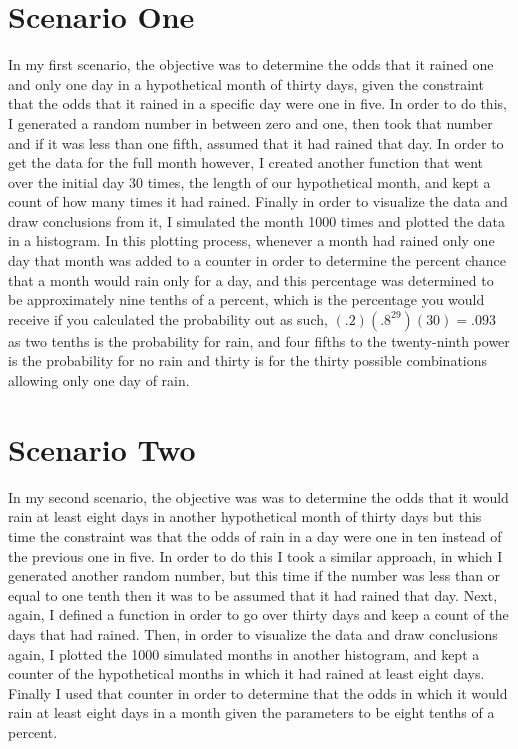 \documentclass[twocolumn]{revtex4}
\begin{document}
\section{Scenario One}
In my first scenario, the objective was to determine the odds that it rained one and only one day in a hypothetical month of thirty days, given the constraint that the odds that it rained in a specific day were one in five. In order to do this, I generated a random number in between zero and one, then took that number and if it was less than one fifth, assumed that it had rained that day. In order to get the data for the full month however, I created another function that went over the initial day 30 times, the length of our hypothetical month, and kept a count of how many times it had rained. Finally in order to visualize the data and draw conclusions from it, I simulated the month 1000 times and plotted the data in a histogram. In this plotting process, whenever a month had rained only one day that month was added to a counter in order to determine the percent chance that a month would rain only for a day, and this percentage was determined to be approximately nine tenths of a percent, which is the percentage you would receive if you calculated the probability out as such, $(.2)(.8^{29})(30)=.093$ as two tenths is the probability for rain, and four fifths to the twenty-ninth power is the probability for no rain and thirty is for the thirty possible combinations allowing only one day of rain.
\section{Scenario Two}
In my second scenario, the objective was was to determine the odds that it would rain at least eight days in another hypothetical month of thirty days but this time the constraint was that the odds of rain in a day were one in ten instead of the previous one in five. In order to do this I took a similar approach, in which I generated another random number, but this time if the number was less than or equal to one tenth then it was to be assumed that it had rained that day. Next, again, I defined a function in order to go over thirty days and keep a count of the days that had rained. Then, in order to visualize the data and draw conclusions again, I plotted the 1000 simulated months in another histogram, and kept a counter of the hypothetical months in which it had rained at least eight days. Finally I used that counter in order to determine that the odds in which it would rain at least eight days in a month given the parameters to be eight tenths of a percent.
\end{document}
